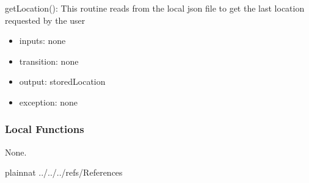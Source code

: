 \documentclass[12pt, titlepage]{article}
\begin{document}
\noindent getLocation():
This routine reads from the local json file to get the last location requested by the user
\begin{itemize}
\item inputs: none
\item transition: none
\item output: storedLocation
\item exception: none
\end{itemize}

\subsubsection{Local Functions}

None.


\newpage

 {plainnat}
 {../../../refs/References}



\end{document}
